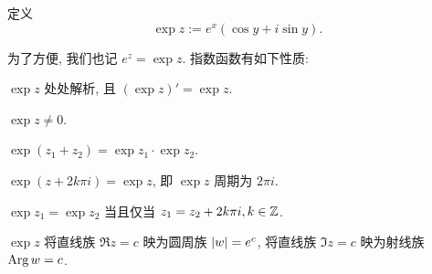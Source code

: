 \begin{definition}
  定义
  \[
    \exp z:=e^x(\cos y+i\sin y).
  \]
\end{definition}
为了方便, 我们也记 \alert{$e^z=\exp z$}.
指数函数有如下性质:
\begin{enumpar}
  \item $\exp z$ 处处解析, 且 $(\exp z)'=\exp z$.
  \item $\exp z\neq 0$.
  \item $\exp(z_1+z_2)=\exp z_1\cdot \exp z_2$.
  \item $\exp(z+2k\pi i)=\exp z$, 即 $\exp z$ 周期为 $2\pi i$.
  \item $\exp z_1=\exp z_2$ 当且仅当 $z_1=z_2+2k\pi i,k\in{\mathbb{Z}}$.
  \item $\exp z$ 将直线族 $\Re z=c$ 映为圆周族 $\left|w\right|=e^c$, 将直线族 $\Im z=c$ 映为射线族 $\operatorname{Arg} w=c$.
\end{enumpar}



